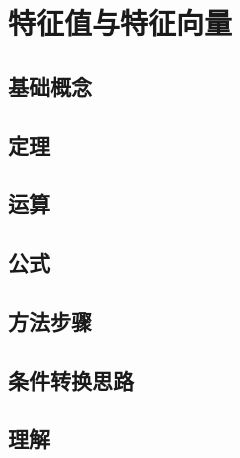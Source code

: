 \documentclass[a4paper,12pt]{article}
\begin{document}


    \section{特征值与特征向量}

    \subsection{基础概念}

    \begin{enumerate}
    \end{enumerate}

    \subsection{定理}

    \begin{enumerate}
    \end{enumerate}

    \subsection{运算}

    \begin{enumerate}

    \end{enumerate}

    \subsection{公式}

    \begin{enumerate}

    \end{enumerate}

    \subsection{方法步骤}

    \begin{enumerate}

    \end{enumerate}

    \subsection{条件转换思路}

    \begin{enumerate}

    \end{enumerate}

    \subsection{理解}

    \begin{enumerate}
    \end{enumerate}
\end{document}
